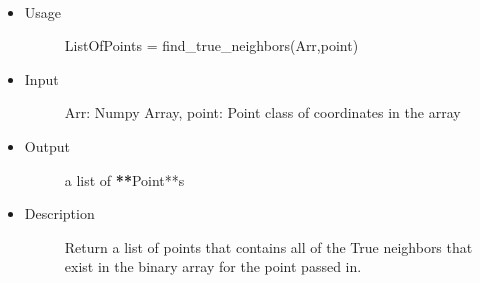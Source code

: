 \documentclass[letterpaper,10pt,oneside]{sphinxmanual}
\begin{document}
\begin{fulllineitems}
\label{index:libcelegans.find_true_neighbors}~\begin{itemize}
\item {} \begin{description}
\item[{Usage }] \leavevmode
ListOfPoints = find\_true\_neighbors(Arr,point)

\end{description}

\item {} \begin{description}
\item[{Input}] \leavevmode
Arr: Numpy Array, point: Point class of coordinates in the array

\end{description}

\item {} \begin{description}
\item[{Output }] \leavevmode
a list of {\color{red}\bfseries{}**}Point**s

\end{description}

\item {} \begin{description}
\item[{Description}] \leavevmode
Return a list of points that contains all of the True neighbors that exist in the
binary array for the point passed in.

\end{description}

\end{itemize}

\end{fulllineitems}

\end{document}
